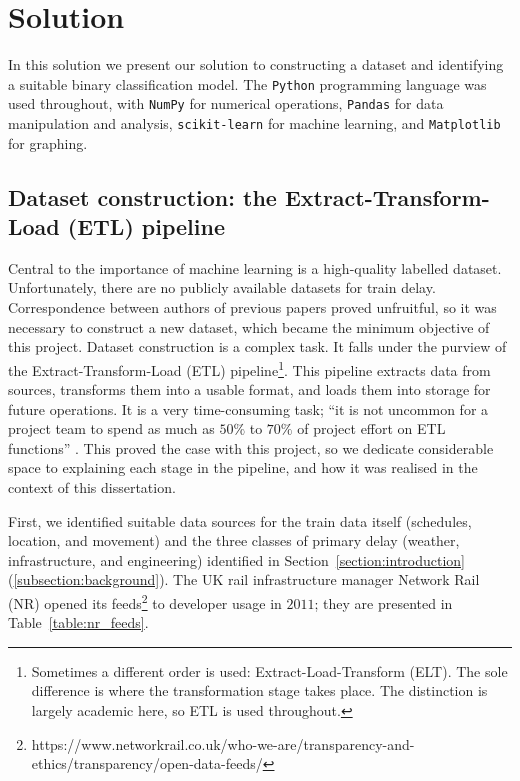 \documentclass[12pt,a4paper]{article}
\begin{document}
\section{Solution}
\label{section:solution}

In this solution we present our solution to constructing a dataset and identifying a suitable binary classification model. The \verb|Python| programming language was used throughout, with \verb|NumPy| for numerical operations, \verb|Pandas| for data manipulation and analysis, \verb|scikit-learn| for machine learning, and \verb|Matplotlib| for graphing. 

\subsection{Dataset construction: the Extract-Transform-Load (ETL) pipeline}

Central to the importance of machine learning is a high-quality labelled dataset. Unfortunately, there are no publicly available datasets for train delay. Correspondence between authors of previous papers \cite{yaghini_et_al_2013,wang_zhang_2019} proved unfruitful, so it was necessary to construct a new dataset, which became the minimum objective of this project. Dataset construction is a complex task. It falls under the purview of the Extract-Transform-Load (ETL) pipeline\footnote{Sometimes a different order is used: Extract-Load-Transform (ELT). The sole difference is where the transformation stage takes place. The distinction is largely academic here, so ETL is used throughout.}. This pipeline extracts data from sources, transforms them into a usable format, and loads them into storage for future operations. It is a very time-consuming task; “it is not uncommon for a project team to spend as much as $50\%$ to $70\%$ of project effort on ETL functions” \cite[p.~284]{ponniah_2010}. This proved the case with this project, so we dedicate considerable space to explaining each stage in the pipeline, and how it was realised in the context of this dissertation.

First, we identified suitable data sources for the train data itself (schedules, location, and movement) and the three classes of primary delay (weather, infrastructure, and engineering) identified in Section~\ref{section:introduction} (\ref{subsection:background}). The UK rail infrastructure manager Network Rail (NR) opened its feeds\footnote{https://www.networkrail.co.uk/who-we-are/transparency-and-ethics/transparency/open-data-feeds/} to developer usage in $2011$; they are presented in Table~\ref{table:nr_feeds}.
\end{document}
